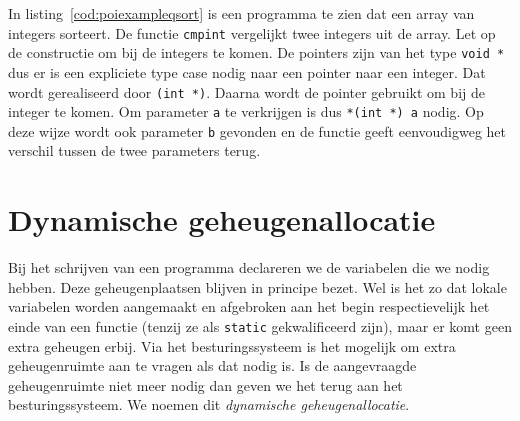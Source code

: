 In listing~\ref{cod:poiexampleqsort} is een programma te zien dat een array van integers sorteert. De functie \texttt{cmpint} vergelijkt twee integers uit de array. Let op de constructie om bij de integers te komen. De pointers zijn van het type \texttt{void~*} dus er is een expliciete type case nodig naar een pointer naar een integer. Dat wordt gerealiseerd door \texttt{(int~*)}. Daarna wordt de pointer gebruikt om bij de integer te komen. Om parameter \texttt{a} te verkrijgen is dus \texttt{*(int~*)~a} nodig. Op deze wijze wordt ook parameter \texttt{b} gevonden en de functie geeft eenvoudigweg het verschil tussen de twee parameters terug.

%
%
%
%
%
%
%
%

\section{Dynamische geheugenallocatie}
Bij het schrijven van een programma declareren we de variabelen die we nodig hebben. Deze geheugenplaatsen blijven in principe bezet. Wel is het zo dat lokale variabelen worden aangemaakt en afgebroken aan het begin respectievelijk het einde van een functie (tenzij ze als \texttt{static} gekwalificeerd zijn), maar er komt geen extra geheugen erbij. Via het besturingssysteem is het mogelijk om extra geheugenruimte aan te vragen als dat nodig is. Is de aangevraagde geheugenruimte niet meer nodig dan geven we het terug aan het besturingssysteem. We noemen dit \textsl{dynamische geheugenallocatie}.

